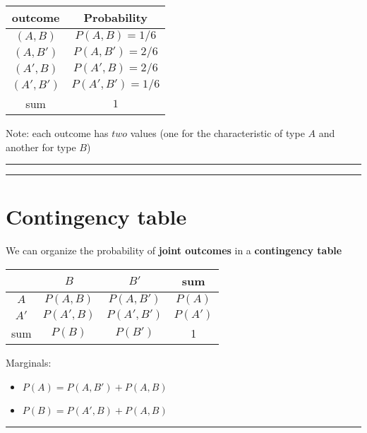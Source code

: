 \documentclass[
]{book}
\providecommand{\tightlist}{%
  \setlength{\itemsep}{0pt}\setlength{\parskip}{0pt}}
\begin{document}
\begin{longtable}[]{@{}cc@{}}
\toprule
outcome & Probability \\
\midrule
\endhead
\((A, B)\) & \(P(A, B)=1/6\) \\
\((A, B')\) & \(P(A, B')=2/6\) \\
\((A', B)\) & \(P(A', B)=2/6\) \\
\((A', B')\) & \(P(A', B')=1/6\) \\
sum & \(1\) \\
\bottomrule
\end{longtable}

Note: each outcome has \(two\) values (one for the characteristic of type \(A\) and another for type \(B\))

\begin{center}\rule{0.5\linewidth}{0.5pt}\end{center}

\begin{center}\rule{0.5\linewidth}{0.5pt}\end{center}

\hypertarget{contingency-table}{%
\section{Contingency table}\label{contingency-table}}

We can organize the probability of \textbf{joint outcomes} in a \textbf{contingency table}

\begin{longtable}[]{@{}cccc@{}}
\toprule
& \(B\) & \(B'\) & sum \\
\midrule
\endhead
\(A\) & \(P(A, B )\) & \(P(A, B' )\) & \(P(A)\) \\
\(A'\) & \(P(A', B )\) & \(P(A', B' )\) & \(P(A')\) \\
sum & \(P(B)\) & \(P(B')\) & 1 \\
\bottomrule
\end{longtable}

Marginals:

\begin{itemize}
\tightlist
\item
  \(P(A)=P(A, B') + P(A, B)\)
\item
  \(P(B)=P(A', B) +P(A, B)\)
\end{itemize}

\begin{center}\rule{0.5\linewidth}{0.5pt}\end{center}
\end{document}

